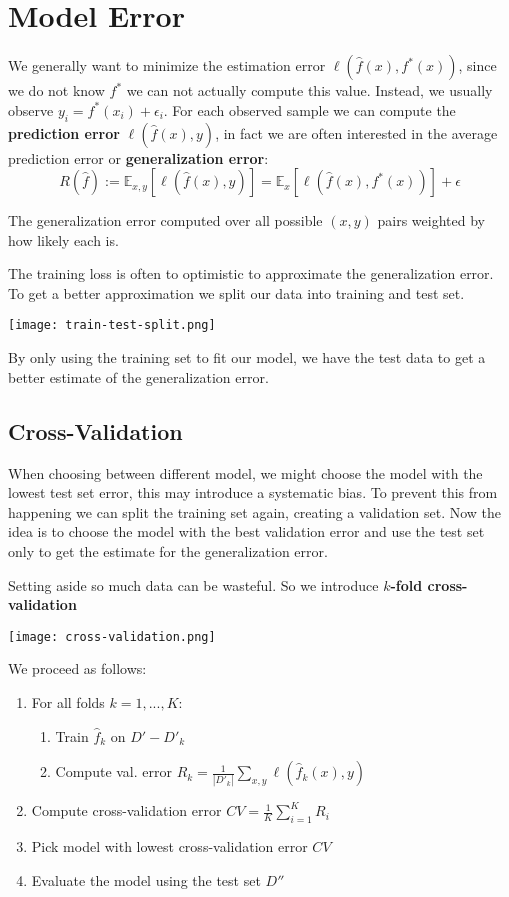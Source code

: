 \section{Model Error}

We generally want to minimize the estimation error $\ell(\hat{f}(x), f^*(x))$, since we do not know $f^*$ we can not actually compute this value. Instead, we usually observe $y_i = f^*(x_i) + \epsilon_i$. For each observed sample we can compute the \textbf{prediction error} $\ell(\hat{f}(x), y)$, in fact we are often interested in the average prediction error or \textbf{generalization error}:
$$R(\hat{f}) := \mathbb{E}_{x,y}[\ell(\hat{f}(x), y)] = \mathbb{E}_x[\ell(\hat{f}(x), f^*(x))] + \epsilon$$

The generalization error computed over all possible $(x,y)$ pairs weighted by how likely each is. 

The training loss is often to optimistic to approximate the generalization error. To get a better approximation we split our data into training and test set. 

\texttt{[image: train-test-split.png]}

By only using the training set to fit our model, we have the test data to get a better estimate of the generalization error.

\subsection{Cross-Validation}

When choosing between different model, we might choose the model with the lowest test set error, this may introduce a systematic bias. To prevent this from happening we can split the training set again, creating a validation set. Now the idea is to choose the model with the best validation error and use the test set only to get the estimate for the generalization error.

Setting aside so much data can be wasteful. So we introduce \textbf{$k$-fold cross-validation}

\texttt{[image: cross-validation.png]}

We proceed as follows:
\begin{enumerate}
	\item For all folds $k = 1,..., K$: 
		\begin{enumerate}
			\item Train $\hat{f}_k$ on $D' - D'_k$
			\item Compute val. error $R_k = \frac{1}{|D'_k|} \sum_{x,y} \ell(\hat{f}_k(x), y)$
		\end{enumerate}
	\item Compute cross-validation error $CV = \frac{1}{K} \sum_{i=1}^K R_i$
	\item Pick model with lowest cross-validation error $CV$
	\item Evaluate the model using the test set $D''$
\end{enumerate}

